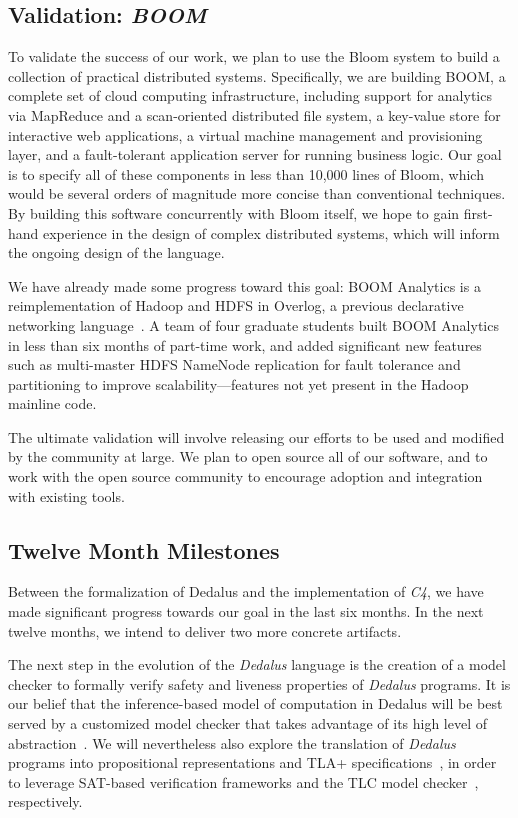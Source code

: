 \subsection{Validation: \emph{BOOM}}
To validate the success of our work, we plan to use the Bloom system
to build a collection of practical distributed systems. Specifically,
we are building BOOM, a complete set of cloud computing
infrastructure, including support for analytics via MapReduce and a
scan-oriented distributed file system, a key-value store for
interactive web applications, a virtual machine management and
provisioning layer, and a fault-tolerant application server for
running business logic. Our goal is to specify all of these components
in less than 10,000 lines of Bloom, which would be several orders of
magnitude more concise than conventional techniques. By building this
software concurrently with Bloom itself, we hope to gain first-hand
experience in the design of complex distributed systems, which will
inform the ongoing design of the language.

We have already made some progress toward this goal: BOOM Analytics is
a reimplementation of Hadoop and HDFS in Overlog, a previous
declarative networking language~\cite{boom-eurosys}. A team of four
graduate students built BOOM Analytics in less than six months of
part-time work, and added significant new features such as
multi-master HDFS NameNode replication for fault tolerance and
partitioning to improve scalability---features not yet present in the
Hadoop mainline code.


The ultimate validation will involve releasing our efforts to be used
and modified by the community at large. We plan to open source all of
our software, and to work with the open source community to encourage
adoption and integration with existing tools.

\subsection{Twelve Month Milestones}

Between the formalization of Dedalus and the implementation of  \emph{C4}, we have made significant progress towards
our goal in the last six months.  In the next twelve months, we intend to deliver two more concrete artifacts.

The next step in the evolution of the \emph{Dedalus} language is the creation of a model checker to formally verify safety and liveness
properties of \emph{Dedalus} programs.  It is our belief that the inference-based model of computation in Dedalus will
be best served by a customized model checker that takes advantage of its high level of abstraction~\cite{cardan, armc}.  
We will nevertheless also explore the
translation of \emph{Dedalus} programs into propositional representations and TLA+ specifications~\cite{tla}, in order to leverage SAT-based 
verification frameworks and the TLC model checker~\cite{tlc}, respectively.  

